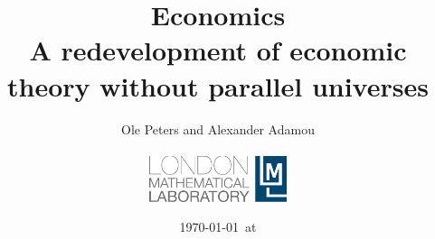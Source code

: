


\title{Economics\\
\large{A redevelopment of economic theory without parallel universes}}
\author{Ole Peters and Alexander Adamou\\
\vspace{10cm}\\
\includegraphics[width=0.3\textwidth]{./lml_LOGO_whiteBG-eps-converted-to.pdf}}


\date{\today ~at \currenttime }

\maketitle

\tableofcontents
%
%



%
%
%

\FloatBarrier
\printnoidxglossaries




